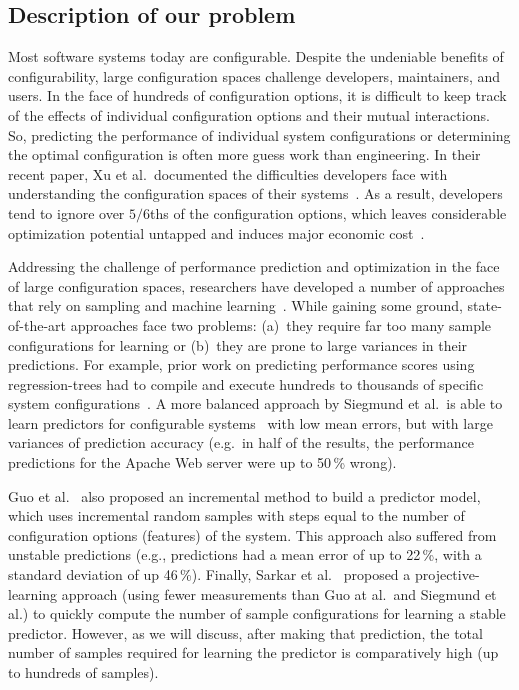 \documentclass{newsig}
\begin{document}
 \subsection{Description of our problem}\label{section:problem_statement}
 Most software systems today are configurable. Despite the undeniable benefits
of configurability, 
large configuration spaces challenge developers, maintainers, and users. In the face of hundreds of configuration options, it is difficult to keep track of the effects of individual configuration options and their mutual interactions. So, predicting the performance of individual system configurations or determining the optimal configuration is often more guess work than engineering. In their recent paper, Xu et al.\ documented the  difficulties developers face
with understanding  the configuration spaces of their systems~\cite{xu2015hey}. As a result, developers tend to ignore over $5/6$ths of the configuration options, which leaves considerable optimization potential untapped and induces major economic cost~\cite{xu2015hey}.

Addressing the challenge of performance prediction and optimization in the face of large configuration spaces, researchers have developed a number of approaches that rely on sampling and machine learning~\cite{siegmund2012predicting,guo2013variability,sarkar2015cost}.
While gaining some ground, state-of-the-art approaches face two problems: 
(a)~they require far too many sample configurations for learning or (b)~they are prone to large variances in their predictions. For example, prior work on predicting performance scores using regression-trees had to compile and execute hundreds to thousands of specific system configurations~\cite{guo2013variability}. 
A more balanced approach by Siegmund et al.\ is able to learn predictors for  configurable systems~\cite{siegmund2012predicting} with low mean errors, but with large variances of prediction accuracy  (e.g.\ in half of the results, the performance predictions for the Apache Web server were up to 50\,\% wrong). 
 
Guo et al.~\cite{guo2013variability} also proposed an incremental method to build a predictor model, which uses incremental random samples with steps equal to the number of configuration options (features) of the system. This approach also
suffered from  unstable predictions (e.g., predictions had a mean error of up to 22\,\%, with a standard deviation of up 46\,\%). Finally, Sarkar et al.~\cite{sarkar2015cost} proposed a proj\-ective-learning approach (using fewer measurements than Guo at al.\ and Siegmund et al.) to quickly compute  the number of sample configurations for learning a stable predictor. However, as we will discuss, after making that prediction, the total number of samples required for learning the predictor is comparatively high (up to hundreds of samples).
\end{document}
